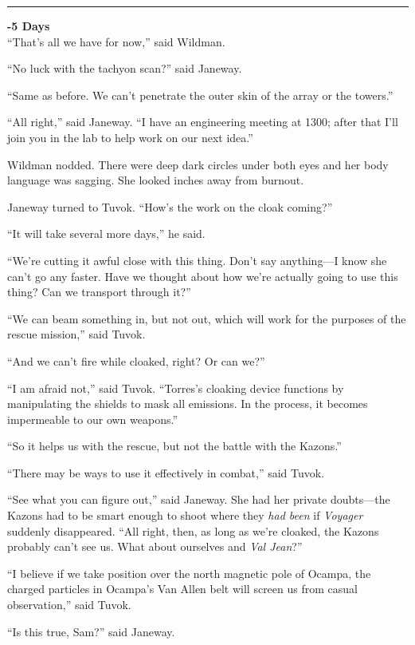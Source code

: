 \documentclass[twoside,letterpaper,12pt]{memoir}
\begin{document}
\fancybreak{\rule{3cm}{0.4 pt}} 

\noindent\textbf{-5 Days} \\

``That's all we have for now,'' said Wildman. 

``No luck with the tachyon scan?'' said Janeway. 

``Same as before. We can't penetrate the outer skin of the array or the towers.'' 

``All right,'' said Janeway. ``I have an engineering meeting at 1300; after that I'll join you in the lab to help work on our next idea.'' 

Wildman nodded. There were deep dark circles under both eyes and her body language was sagging. She looked inches away from burnout. 

Janeway turned to Tuvok. ``How's the work on the cloak coming?'' 

``It will take several more days,'' he said. 

``We're cutting it awful close with this thing. Don't say anything---I know she can't go any faster. Have we thought about how we're actually going to use this thing? Can we transport through it?'' 

``We can beam something in, but not out, which will work for the purposes of the rescue mission,'' said Tuvok. 

``And we can't fire while cloaked, right? Or can we?'' 

``I am afraid not,'' said Tuvok. ``Torres's cloaking device functions by manipulating the shields to mask all emissions. In the process, it becomes impermeable to our own weapons.'' 

``So it helps us with the rescue, but not the battle with the Kazons.'' 

``There may be ways to use it effectively in combat,'' said Tuvok. 

``See what you can figure out,'' said Janeway. She had her private doubts---the Kazons had to be smart enough to shoot where they \textit{had been} if \textit{Voyager} suddenly disappeared. ``All right, then, as long as we're cloaked, the Kazons probably can't see us. What about ourselves and \textit{Val Jean}?'' 

``I believe if we take position over the north magnetic pole of Ocampa, the charged particles in Ocampa's Van Allen belt will screen us from casual observation,'' said Tuvok. 

``Is this true, Sam?'' said Janeway. 
\end{document}

